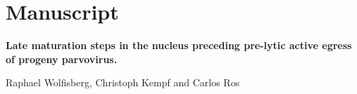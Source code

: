 \label{ChapterPub1}






\chapter{Manuscript}
\begin{center}
\vspace{5.5cm}

\LARGE{\textbf{Late maturation steps in the nucleus preceding pre-lytic active egress of
progeny parvovirus.}}

\vspace{3cm}

Raphael Wolfisberg, Christoph Kempf and Carlos Ros
\end{center}


\afterpage{\blankpage}





\label{ChapterPub1End}

